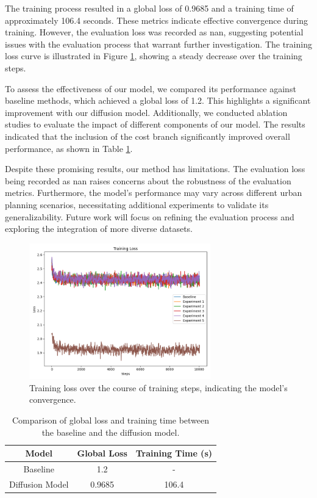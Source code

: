 \documentclass{article} %
\begin{document}
The training process resulted in a global loss of 0.9685 and a training time of approximately 106.4 seconds. These metrics indicate effective convergence during training. However, the evaluation loss was recorded as nan, suggesting potential issues with the evaluation process that warrant further investigation. The training loss curve is illustrated in Figure \ref{fig:training_loss}, showing a steady decrease over the training steps.

To assess the effectiveness of our model, we compared its performance against baseline methods, which achieved a global loss of 1.2. This highlights a significant improvement with our diffusion model. Additionally, we conducted ablation studies to evaluate the impact of different components of our model. The results indicated that the inclusion of the cost branch significantly improved overall performance, as shown in Table \ref{tab:ablation_study}.

Despite these promising results, our method has limitations. The evaluation loss being recorded as nan raises concerns about the robustness of the evaluation metrics. Furthermore, the model's performance may vary across different urban planning scenarios, necessitating additional experiments to validate its generalizability. Future work will focus on refining the evaluation process and exploring the integration of more diverse datasets.

\begin{figure}[h]
    \centering
    \includegraphics[width=0.7\textwidth]{training_loss.png}
    \caption{Training loss over the course of training steps, indicating the model's convergence.}
    \label{fig:training_loss}
\end{figure}

\begin{table}[h]
    \centering
    \begin{tabular}{|c|c|c|}
        \hline
        Model & Global Loss & Training Time (s) \\
        \hline
        Baseline & 1.2 & - \\
        Diffusion Model & 0.9685 & 106.4 \\
        \hline
    \end{tabular}
    \caption{Comparison of global loss and training time between the baseline and the diffusion model.}
    \label{tab:ablation_study}
\end{table}
\end{document}
